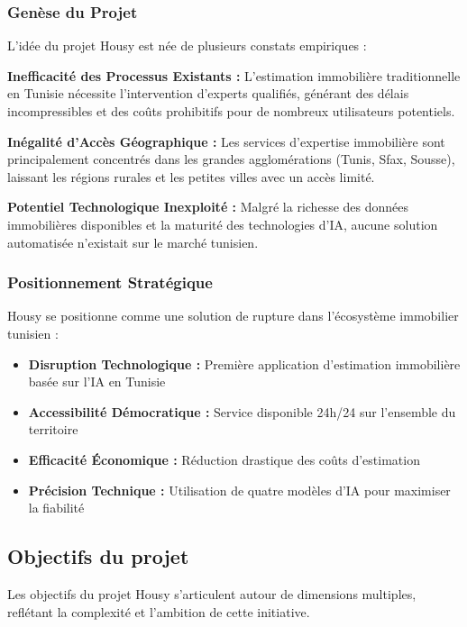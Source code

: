 \subsubsection{Genèse du Projet}

L'idée du projet Housy est née de plusieurs constats empiriques :

\textbf{Inefficacité des Processus Existants :}
L'estimation immobilière traditionnelle en Tunisie nécessite l'intervention d'experts qualifiés, générant des délais incompressibles et des coûts prohibitifs pour de nombreux utilisateurs potentiels.

\textbf{Inégalité d'Accès Géographique :}
Les services d'expertise immobilière sont principalement concentrés dans les grandes agglomérations (Tunis, Sfax, Sousse), laissant les régions rurales et les petites villes avec un accès limité.

\textbf{Potentiel Technologique Inexploité :}
Malgré la richesse des données immobilières disponibles et la maturité des technologies d'IA, aucune solution automatisée n'existait sur le marché tunisien.

\subsubsection{Positionnement Stratégique}

Housy se positionne comme une solution de rupture dans l'écosystème immobilier tunisien :

\begin{itemize}
    \item \textbf{Disruption Technologique :} Première application d'estimation immobilière basée sur l'IA en Tunisie
    \item \textbf{Accessibilité Démocratique :} Service disponible 24h/24 sur l'ensemble du territoire
    \item \textbf{Efficacité Économique :} Réduction drastique des coûts d'estimation
    \item \textbf{Précision Technique :} Utilisation de quatre modèles d'IA pour maximiser la fiabilité
\end{itemize}

\subsection{Objectifs du projet}

Les objectifs du projet Housy s'articulent autour de dimensions multiples, reflétant la complexité et l'ambition de cette initiative.

